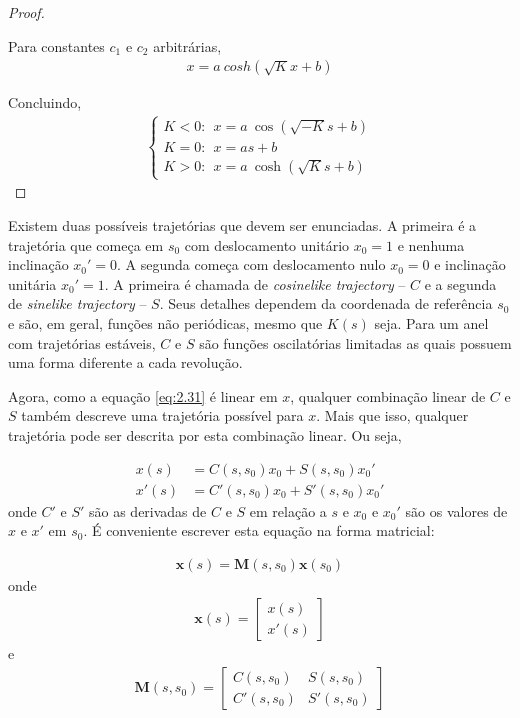 \begin{proof}
\begin{itemize}
		Para constantes $c_1$ e $c_2$ arbitrárias,
		\begin{align*}
          x = a \ cosh(\sqrt{K}x + b)
		\end{align*}
	\end{itemize}
	
	Concluindo,
	\begin{align*}
        \left\{\begin{array}{l}
        K<0: \ \ x = a\ \cos(\sqrt{-K}s+b) \\
        K=0: \ \ x = as+b \\
        K>0: \ \ x = a\ \cosh(\sqrt{K}s+b)
        \end{array}\right.
	\end{align*}
\end{proof}
	
Existem duas possíveis trajetórias que devem ser enunciadas. A primeira é a trajetória que começa em $s_0$ com deslocamento unitário $x_0=1$ e nenhuma inclinação $x_0'=0$. A segunda começa com deslocamento nulo $x_0=0$ e inclinação unitária $x_0'= 1$. A primeira é chamada de \textit{cosinelike trajectory} -- $C$ e a segunda de \textit{sinelike trajectory} -- $S$. Seus detalhes dependem da coordenada de referência $s_0$ e são, em geral, funções não periódicas, mesmo que $K(s)$ seja. Para um anel com trajetórias estáveis, $C$ e $S$ são funções oscilatórias limitadas as quais possuem uma forma diferente a cada revolução.
	
Agora, como a equação \eqref{eq:2.31} é linear em $x$, qualquer combinação linear de $C$ e $S$ também descreve uma trajetória possível para $x$. Mais que isso, qualquer trajetória pode ser descrita por esta combinação linear. Ou seja,
	
\begin{align}
	x(s) &= C(s,s_0)x_0 + S(s,s_0)x_0'\\
	x'(s) &= C'(s,s_0)x_0 + S'(s,s_0)x_0'
\end{align}
onde $C'$ e $S'$ são as derivadas de $C$ e $S$ em relação a $s$ e $x_0$ e $x_0'$ são os valores de $x$ e $x'$ em $s_0$. É conveniente escrever esta equação na forma matricial:
	
\begin{align}
	\boldsymbol{x}(s)=\boldsymbol{M}(s,s_0)\boldsymbol{x}(s_0)
\end{align}
onde 
\begin{align}
	\boldsymbol{x}(s) = \begin{bmatrix}
	x(s)\\ 
	x'(s)
	\end{bmatrix}
\end{align}
e
\begin{align}
	\boldsymbol{M}(s,s_0) = \begin{bmatrix}
	C(s,s_0) & S(s,s_0)\\
	C'(s,s_0) & S'(s,s_0)
	\end{bmatrix}\label{eq:2.37}
\end{align}
	
